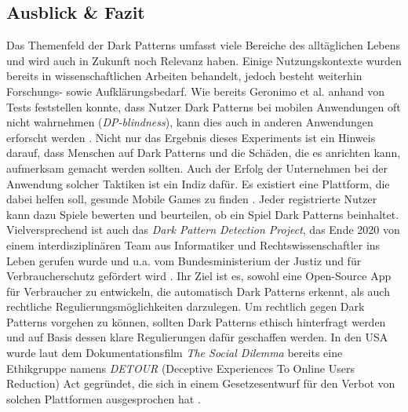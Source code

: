 \documentclass[a4paper]{article}
\begin{document}
\subsection{Ausblick \& Fazit}
\label{sub:ausblick}
Das Themenfeld der Dark Patterns umfasst viele Bereiche des alltäglichen Lebens und wird auch in Zukunft noch Relevanz haben. Einige Nutzungskontexte wurden bereits in wissenschaftlichen Arbeiten behandelt, jedoch besteht weiterhin Forschungs- sowie Aufklärungsbedarf. 
Wie bereits Geronimo et al. anhand von Tests feststellen konnte, dass Nutzer Dark Patterns bei mobilen Anwendungen oft nicht wahrnehmen (\textit{DP-blindness}), kann dies auch in anderen Anwendungen erforscht werden \cite{geronimo}. Nicht nur das Ergebnis dieses Experiments ist ein Hinweis darauf, dass Menschen auf Dark Patterns und die Schäden, die es anrichten kann, aufmerksam gemacht werden sollten. Auch der Erfolg der Unternehmen bei der Anwendung solcher Taktiken ist ein Indiz dafür.\newline\newline
Es existiert eine Plattform, die dabei helfen soll, gesunde Mobile Games zu finden \cite{dp_games}. Jeder registrierte Nutzer kann dazu Spiele bewerten und beurteilen, ob ein Spiel Dark Patterns beinhaltet.\newline
Vielversprechend ist auch das \textit{Dark Pattern Detection Project}, das Ende 2020 von einem interdisziplinären Team aus Informatiker und Rechtswissenschaftler ins Leben gerufen wurde und u.a. vom Bundesministerium der Justiz und für Verbraucherschutz gefördert wird \cite{dapde}. Ihr Ziel ist es, sowohl eine Open-Source App für Verbraucher zu entwickeln, die automatisch Dark Patterns erkennt, als auch rechtliche Regulierungsmöglichkeiten darzulegen.\newline
Um rechtlich gegen Dark Patterns vorgehen zu können, sollten Dark Patterns ethisch hinterfragt werden und auf Basis dessen klare Regulierungen dafür geschaffen werden. In den USA wurde laut dem Dokumentationsfilm \textit{The Social Dilemma} bereits eine Ethikgruppe namens \textit{DETOUR} (Deceptive Experiences To Online Users Reduction) Act gegründet, die sich in einem Gesetzesentwurf für den Verbot von solchen Plattformen ausgesprochen hat \cite{the_social_dilemma}.\newline
\end{document}
